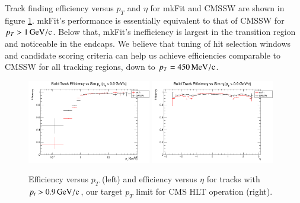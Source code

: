 \documentclass{webofc}
\def\mkfit{mkFit\xspace}
\def\MeVoc{\ensuremath{\,\rm{M}e\rm{V}/c}}
\def\GeVoc{\ensuremath{\,\rm{G}e\rm{V}/c}}
\def\twop{0.48\textwidth}
\def\postfigskip{\vskip-4mm}
\begin{document}
Track finding efficiency versus $p_T$ and $\eta$ for \mkfit and CMSSW are shown
in figure \ref{fig:eff-pt-etapt0p9}. \mkfit's performance is essentially
equivalent to that of CMSSW for $p_T > 1\GeVoc$. Below that, \mkfit's
inefficiency is largest in the transition region and noticeable in the
endcaps. We believe that tuning of hit selection windows and candidate scoring
criteria can help us achieve efficiencies comparable to CMSSW for all tracking
regions, down to $p_T = 450\MeVoc$.

\begin{figure}[thb]
  \centering
  \includegraphics[width=\twop]{figs/phys/SKL-SP_CMSSW_TTbar_PU70_eff_pt_logx_build_pt0p0_SIMVAL.png}
  \hfill
  \includegraphics[width=\twop]{figs/phys/SKL-SP_CMSSW_TTbar_PU70_eff_eta_build_pt0p9_SIMVAL.png}
  \postfigskip

  \caption{Efficiency versus $p_T$ (left) and efficiency versus $\eta$ for
    tracks with $p_t>0.9\GeVoc$, our target $p_T$ limit for CMS HLT operation (right).}
  \label{fig:eff-pt-etapt0p9}
\end{figure}
\end{document}
